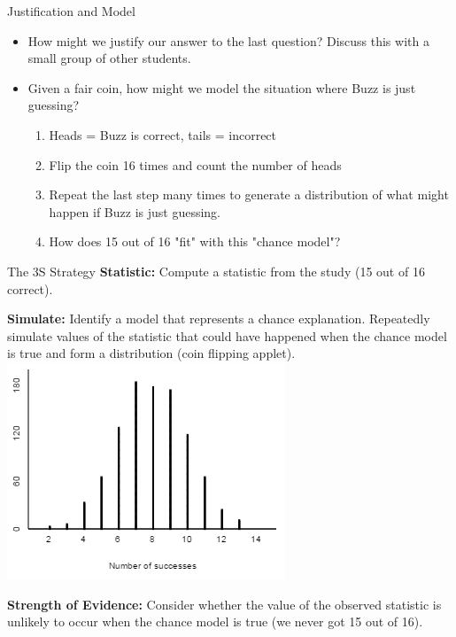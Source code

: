 \documentclass[13pt]{beamer}
\newcounter{count}
\newenvironment{stepenumerate}{\begin{enumerate}[<+->]}{\end{enumerate}}
\newenvironment{stepitemize}{\begin{itemize}[<+->]}{\end{itemize} }
\begin{document}
\begin{frame}{Justification and Model}
 \begin{stepitemize}
  \item How might we justify our answer to the last question? Discuss this with a small group of other students.
  
  \item Given a fair coin, how might we model the situation where Buzz is just guessing?
  \begin{stepenumerate}
    \item Heads = Buzz is correct, tails = incorrect
    \item Flip the coin 16 times and count the number of heads
    \item Repeat the last step many times to generate a distribution of what might happen if Buzz is just guessing.
    \item How does 15 out of 16 "fit" with  this "chance model"?
  \end{stepenumerate}
\end{stepitemize}
\end{frame}

\begin{frame}{The 3S Strategy}
\textbf{Statistic:} Compute a statistic from the study (15 out of 16 correct).\smallskip

\begin{multicols}{2}
\textbf{Simulate:} Identify a model that represents a chance explanation. Repeatedly simulate values of the statistic that could have happened when the chance model is true and form a distribution (coin flipping applet). 
\includegraphics[width=2.37 in]{dolphindistribution.PNG}
\end{multicols}

\textbf{Strength of Evidence:} Consider whether the value of the observed statistic is unlikely to occur when the chance model is true (we never got 15 out of 16). 
\end{frame}
\end{document}
